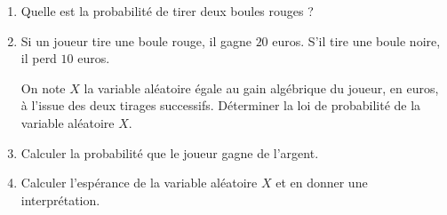 \documentclass[main.tex]{subfiles}
\begin{document}
\begin{exercise}
\begin{enumerate}[label=\arabic*),leftmargin=*]
{ 
} 
	\item Quelle est la probabilité de tirer deux boules rouges ?
	\item Si un joueur tire une boule rouge, il gagne $20$ euros. S'il tire une boule noire, il perd $10$ euros. 
	
	On note $X$ la variable aléatoire égale au gain algébrique du joueur, en euros, à l'issue des deux tirages successifs. 
	Déterminer la loi de probabilité de la variable aléatoire $X$.
	\item Calculer la probabilité que le joueur gagne de l'argent.
	\item Calculer l'espérance de la variable aléatoire $X$ et en donner une interprétation.
	\end{enumerate}
	 
\end{exercise} 
%	 
\newpage 
\end{document}
